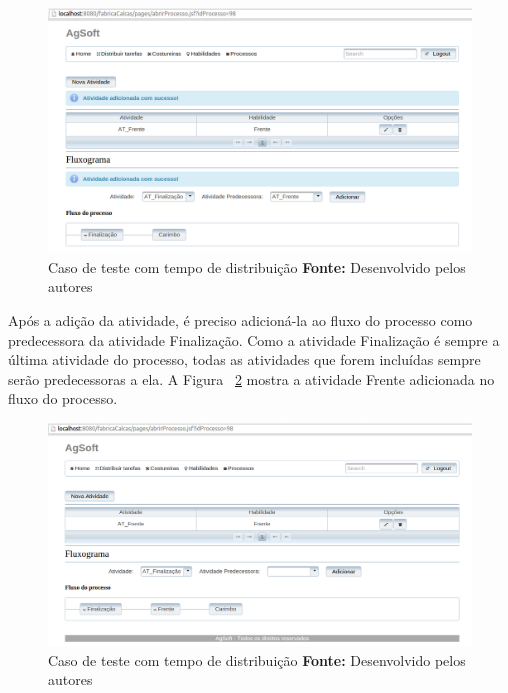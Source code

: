 \begin{figure}[h!]
	\centerline{\includegraphics[scale=0.3]{./imagens/adiconar_atividade_frente_teste5.png}}
	\caption[Caso de teste com tempo de distribuição]
	{Caso de teste com tempo de distribuição \textbf{Fonte:} Desenvolvido pelos autores}
	\label{fig:add_frente_teste5}
\end{figure}

\par Após a adição da atividade, é preciso adicioná-la ao fluxo do processo como
predecessora da atividade Finalização. Como a atividade Finalização é sempre a
última atividade do processo, todas as atividades que forem incluídas sempre
serão predecessoras a ela.  A Figura ~\ref{fig:add_frente_teste4} mostra a atividade Frente adicionada
no fluxo do processo.

\newpage

\begin{figure}[h!]
	\centerline{\includegraphics[scale=0.3]{./imagens/adicionar_atividade_frente_teste4.png}}
	\caption[Caso de teste com tempo de distribuição]
	{Caso de teste com tempo de distribuição \textbf{Fonte:} Desenvolvido pelos autores}
	\label{fig:add_frente_teste4}
\end{figure}


